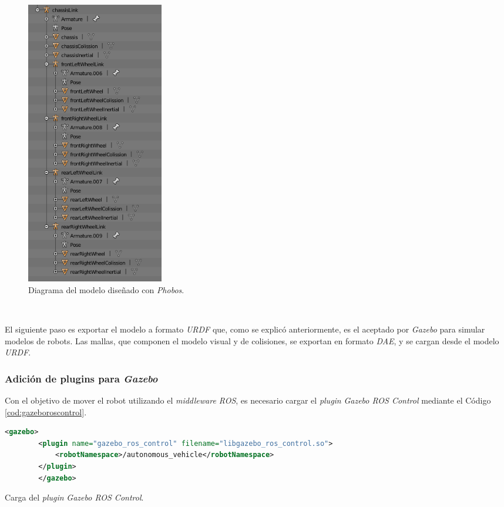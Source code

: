 \begin{figure} [h!]
	\begin{center}
		\includegraphics[width=6cm]{figs/phobosDiagram}
	\end{center}
	\caption{Diagrama del modelo diseñado con \textit{Phobos}.}
	\label{fig:blenderdiagram}
\end{figure}\

El siguiente paso es exportar el modelo a formato \textit{URDF} que, como se explicó anteriormente, es el aceptado por \textit{Gazebo} para simular modelos de robots. Las mallas, que componen el modelo visual y de colisiones, se exportan en formato \textit{DAE}, y se cargan desde el modelo \textit{URDF}.\\

\subsubsection{Adición de plugins para \textit{Gazebo}}

Con el objetivo de mover el robot utilizando el \textit{middleware ROS}, es necesario cargar el \textit{plugin} \textit{Gazebo ROS Control} mediante el Código \ref{cod:gazeboroscontrol}.\\

\begin{code}[h]
	\begin{lstlisting}[language=XML]
		<gazebo>
		<plugin name="gazebo_ros_control" filename="libgazebo_ros_control.so">
			<robotNamespace>/autonomous_vehicle</robotNamespace>
		</plugin>
		</gazebo>
	\end{lstlisting}
	\caption[Carga del \textit{plugin} \textit{Gazebo ROS Control}.]{Carga del \textit{plugin} \textit{Gazebo ROS Control}.}
	\label{cod:gazeboroscontrol}
\end{code}

